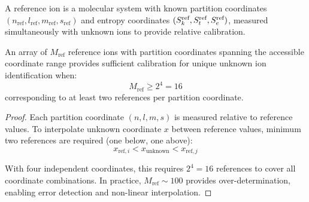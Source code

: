 \begin{definition}
\label{def:reference_ion}
A reference ion is a molecular system with known partition coordinates $(n_{\text{ref}}, l_{\text{ref}}, m_{\text{ref}}, s_{\text{ref}})$ and entropy coordinates $(S_k^{\text{ref}}, S_t^{\text{ref}}, S_e^{\text{ref}})$, measured simultaneously with unknown ions to provide relative calibration.
\end{definition}

\begin{theorem}
\label{thm:reference_sufficiency}
An array of $M_{\text{ref}}$ reference ions with partition coordinates spanning the accessible coordinate range provides sufficient calibration for unique unknown ion identification when:
\begin{equation}
M_{\text{ref}} \geq 2^4 = 16
\end{equation}
corresponding to at least two references per partition coordinate.
\end{theorem}

\begin{proof}
Each partition coordinate $(n, l, m, s)$ is measured relative to reference values. To interpolate unknown coordinate $x$ between reference values, minimum two references are required (one below, one above):
\begin{equation}
x_{\text{ref},i} < x_{\text{unknown}} < x_{\text{ref},j}
\end{equation}

With four independent coordinates, this requires $2^4 = 16$ references to cover all coordinate combinations. In practice, $M_{\text{ref}} \sim 100$ provides over-determination, enabling error detection and non-linear interpolation.
\end{proof}

